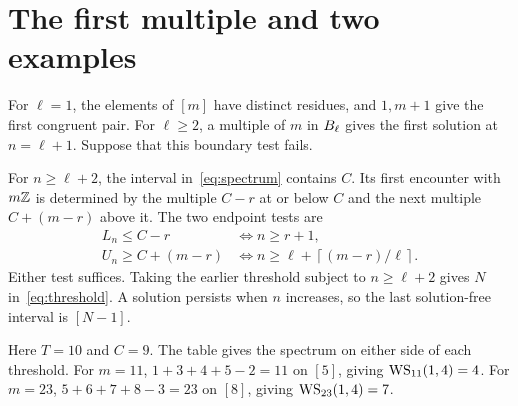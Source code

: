 \documentclass[11pt,a4paper]{article}
\begin{document}
\clearpage
\section{The first multiple and two examples}
For \(\ell=1\), the elements of \([m]\) have distinct residues, and \(1,m+1\) give the first congruent pair. For \(\ell\ge2\), a multiple of \(m\) in \(B_\ell\) gives the first solution at \(n=\ell+1\). Suppose that this boundary test fails.

For \(n\ge\ell+2\), the interval in~\eqref{eq:spectrum} contains \(C\). Its first encounter with \(m\mathbb Z\) is determined by the multiple \(C-r\) at or below \(C\) and the next multiple \(C+(m-r)\) above it. The two endpoint tests are
\begin{align*}
 L_n\le C-r &\iff n\ge r+1,\\
 U_n\ge C+(m-r) &\iff n\ge \ell+\left\lceil(m-r)/\ell\right\rceil .
\end{align*}
Either test suffices. Taking the earlier threshold subject to \(n\ge\ell+2\) gives \(N\) in~\eqref{eq:threshold}. A solution persists when \(n\) increases, so the last solution-free interval is \([N-1]\).\proofsquare

Here \(T=10\) and \(C=9\). The table gives the spectrum on either side of each threshold.
For \(m=11\), \(1+3+4+5-2=11\) on \([5]\), giving \(\operatorname{WS}_{11}(1,4)=4\).
For \(m=23\), \(5+6+7+8-3=23\) on \([8]\), giving \(\operatorname{WS}_{23}(1,4)=7\).


\smallskip
{}

{\small}
\end{document}
